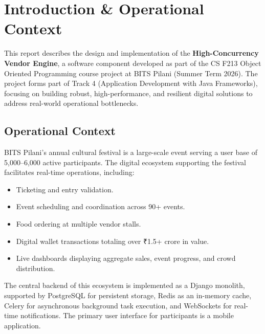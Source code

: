 
\section{Introduction \& Operational Context}
\label{sec:introduction}

This report describes the design and implementation of the \textbf{High-Concurrency Vendor Engine}, a software component developed as part of the CS F213 Object Oriented Programming course project at BITS Pilani (Summer Term 2026). The project forms part of Track 4 (Application Development with Java Frameworks), focusing on building robust, high-performance, and resilient digital solutions to address real-world operational bottlenecks.

\subsection{Operational Context}
BITS Pilani's annual cultural festival is a large-scale event serving a user base of 5,000--6,000 active participants. The digital ecosystem supporting the festival facilitates real-time operations, including:
\begin{itemize}
    \item Ticketing and entry validation.
    \item Event scheduling and coordination across 90+ events.
    \item Food ordering at multiple vendor stalls.
    \item Digital wallet transactions totaling over ₹1.5+ crore in value.
    \item Live dashboards displaying aggregate sales, event progress, and crowd distribution.
\end{itemize}

The central backend of this ecosystem is implemented as a Django monolith, supported by PostgreSQL for persistent storage, Redis as an in-memory cache, Celery for asynchronous background task execution, and WebSockets for real-time notifications. The primary user interface for participants is a mobile application.

